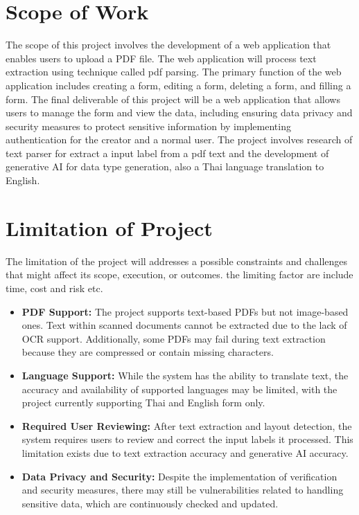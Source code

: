 \documentclass[12pt,oneside,openright,a4paper]{cpe-english-project}
\begin{document}
\section{Scope of Work}

The scope of this project involves the development of a web application that enables users to upload a PDF file. The web application will process text extraction using technique called pdf parsing. The primary function of the web application includes creating a form, editing a form, deleting a form, and filling a form. The final deliverable of this project will be a web application that allows users to manage the form and view the data, including ensuring data privacy and security measures to protect sensitive information by implementing authentication for the creator and a normal user. The project involves research of text parser for extract a input label from a pdf text and the development of generative AI for data type generation, also a Thai language translation to English.

\section{Limitation of Project}
The limitation of the project will addresses a possible constraints and challenges that might affect its scope, execution, or outcomes. the limiting factor are include time, cost and risk etc.

\begin{itemize}
 \item \textbf{PDF Support:} The project supports text-based PDFs but not image-based ones. Text within scanned documents cannot be extracted due to the lack of OCR support. Additionally, some PDFs may fail during text extraction because they are compressed or contain missing characters.
  
    \item \textbf{Language Support:} While the system has the ability to translate text, the accuracy and availability of supported languages may be limited, with the project currently supporting Thai and English form only.
    
    \item \textbf{Required User Reviewing:} After text extraction and layout detection, the system requires users to review and correct the input labels it processed. This limitation exists due to text extraction accuracy and generative AI accuracy.
      
    \item \textbf{Data Privacy and Security:} Despite the implementation of verification and security measures, there may still be vulnerabilities related to handling sensitive data, which are continuously checked and updated.
\end{itemize}
\end{document}
